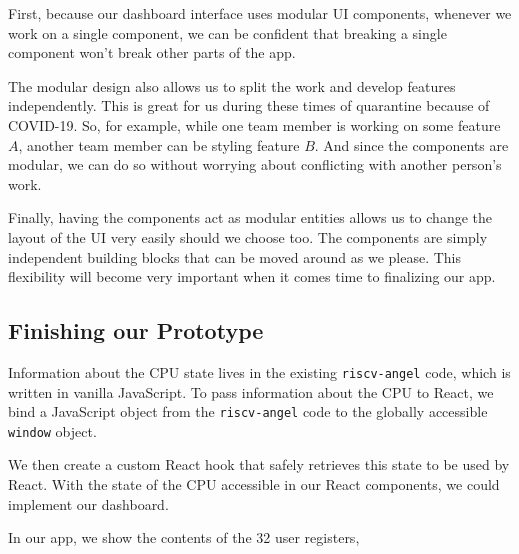 First, because our dashboard interface uses modular UI components, whenever we work on a single
component, we can be confident that breaking a single component won't break other parts of the app.

The modular design also allows us to split the work and develop features independently. This is great for
us during these times of quarantine because of COVID-19. So, for example, while one team member is working on some feature
$A$, another team member can be styling feature $B$. And since the components are modular, we can do so without
worrying about conflicting with another person's work.

Finally, having the components act as modular entities allows us to change the layout of the UI very easily should
we choose too. The components are simply independent building blocks that can be moved around as we please. This
flexibility will become very important when it comes time to finalizing our app.

\subsection*{Finishing our Prototype}

Information about the CPU state lives in the existing \texttt{riscv-angel} code, which is written in
vanilla JavaScript. To pass information about the CPU to React, we bind a JavaScript object from the
\texttt{riscv-angel} code
to the globally accessible \texttt{window} object.

We then create a custom React hook that safely retrieves this state to be used by React.
With the state of the CPU accessible in our React components, we could implement our
dashboard.

In our app, we show the contents of the 32 user registers,

